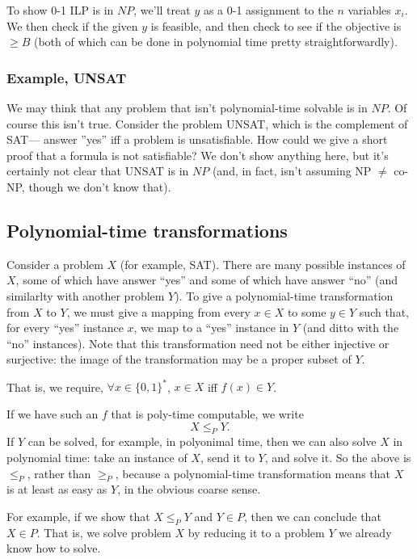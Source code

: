\documentclass{article}
\begin{document}
To show 0-1 ILP is in $NP$, we'll treat $y$ as a 0-1 assignment to the $n$
variables $x_i$.
We then check if the given $y$ is feasible, and then check to see if the 
objective is $\geq B$ (both of which can be done in polynomial time
pretty straightforwardly).

\subsubsection{Example, UNSAT}

We may think that any problem that isn't polynomial-time solvable is in
$NP$. Of course this isn't true.
Consider the problem UNSAT, which is the complement of SAT---
answer ''yes'' iff a problem is unsatisfiable.
How could we give a short proof that a formula is not satisfiable?
We don't show anything here, but it's certainly not clear that UNSAT is in
$NP$ (and, in fact, isn't assuming NP $\neq$ co-NP, though we don't know that).




\subsection{Polynomial-time transformations}

Consider a problem $X$ (for example, SAT).
There are many possible instances of $X$, some of which have answer ``yes''
and some of which have answer ``no'' (and similarlty with another problem $Y$).
To give a polynomial-time transformation from $X$ to $Y$, we must give a
mapping from every $x\in X$ to some $y\in Y$ such that, for every ``yes''
instance $x$, we map to a ``yes'' instance in $Y$ (and ditto with the ``no''
instances).
Note that this transformation need not be either injective or surjective:
the image of the transformation may be a proper subset of $Y$.

That is, we require, $\forall x\in \{0,1\}^*$, $x\in X$ iff $f(x) \in Y$.

If we have such an $f$ that is poly-time computable, we write
$$
X \leq_P Y.
$$
If $Y$ can be solved, for example, in polyonimal time, then we can also
solve $X$ in polynomial time: take an instance of $X$, send it to $Y$, and
solve it. So the above is $\leq_P$, rather than $\geq_P$, because a
polynomial-time transformation means that $X$ is at least as easy as $Y$,
in the obvious coarse sense.

For example, if we show that $X\leq_P Y$ and $Y\in P$, then we can conclude
that $X\in P$.
That is, we solve problem $X$ by reducing it to a problem $Y$ we already know
how to solve.
\end{document}
